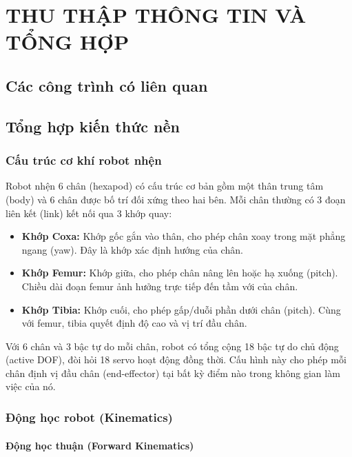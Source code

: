 \chapter{THU THẬP THÔNG TIN VÀ TỔNG HỢP}
    \section{Các công trình có liên quan}
    \section{Tổng hợp kiến thức nền}
        \subsection{Cấu trúc cơ khí robot nhện}

        \hspace{0.5cm} Robot nhện 6 chân (hexapod) có cấu trúc cơ bản gồm một thân trung tâm (body) và 6 chân được bố trí đối xứng theo hai bên. Mỗi chân thường có 3 đoạn liên kết (link) kết nối qua 3 khớp quay:

        \begin{itemize}
            \item \textbf{Khớp Coxa:} Khớp gốc gắn vào thân, cho phép chân xoay trong mặt phẳng ngang (yaw). Đây là khớp xác định hướng của chân.
            \item \textbf{Khớp Femur:} Khớp giữa, cho phép chân nâng lên hoặc hạ xuống (pitch). Chiều dài đoạn femur ảnh hưởng trực tiếp đến tầm với của chân.
            \item \textbf{Khớp Tibia:} Khớp cuối, cho phép gấp/duỗi phần dưới chân (pitch). Cùng với femur, tibia quyết định độ cao và vị trí đầu chân.
        \end{itemize}

        Với 6 chân và 3 bậc tự do mỗi chân, robot có tổng cộng 18 bậc tự do chủ động (active DOF), đòi hỏi 18 servo hoạt động đồng thời. Cấu hình này cho phép mỗi chân định vị đầu chân (end-effector) tại bất kỳ điểm nào trong không gian làm việc của nó.

        \subsection{Động học robot (Kinematics)}

        \subsubsection{Động học thuận (Forward Kinematics)}

